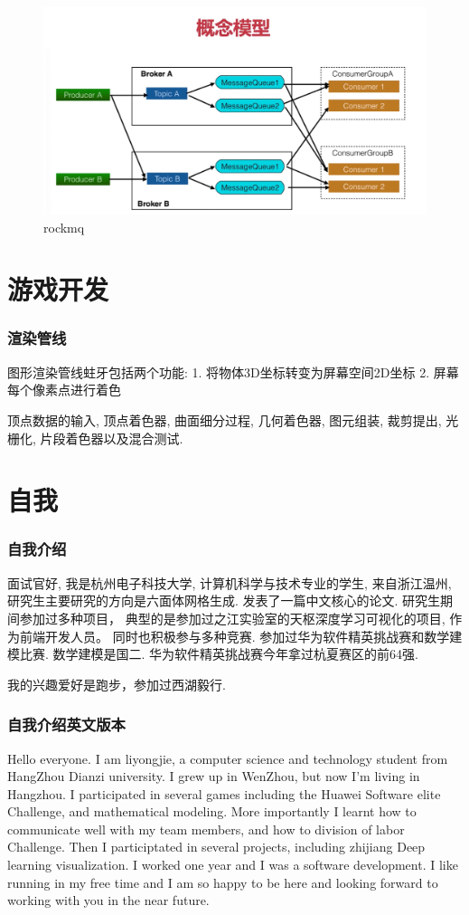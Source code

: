 \documentclass[UTF8]{ctexart}
\begin{document}
\begin{figure}
	\centering
	\includegraphics[width=0.7\linewidth]{figures/rockmq.png}
	\caption{rockmq}
	\label{fig:rockmq}
\end{figure}

\section{游戏开发}
\subsubsection{渲染管线}
图形渲染管线蛀牙包括两个功能:
1. 将物体3D坐标转变为屏幕空间2D坐标
2. 屏幕每个像素点进行着色

顶点数据的输入, 顶点着色器, 曲面细分过程, 几何着色器, 图元组装, 裁剪提出, 光栅化, 片段着色器以及混合测试.

\section{自我}
\subsubsection{自我介绍}
面试官好, 我是杭州电子科技大学, 计算机科学与技术专业的学生, 来自浙江温州,
研究生主要研究的方向是六面体网格生成. 发表了一篇中文核心的论文.
研究生期间参加过多种项目， 典型的是参加过之江实验室的天枢深度学习可视化的项目, 作为前端开发人员。
同时也积极参与多种竞赛. 参加过华为软件精英挑战赛和数学建模比赛. 数学建模是国二. 华为软件精英挑战赛今年拿过杭夏赛区的前64强. \par
我的兴趣爱好是跑步，参加过西湖毅行.
\subsubsection{自我介绍英文版本}
Hello everyone. I am liyongjie, a computer science and technology student from HangZhou Dianzi university. I grew up in WenZhou, but now I'm living in Hangzhou. I participated in several games including the Huawei Software elite Challenge, and mathematical modeling. More importantly I learnt how to communicate well with my team members, and how to division of labor Challenge. Then I participtated in several projects, including zhijiang Deep learning visualization. I worked one year and I was a software development. I like running in my free time and I am so happy to be here and looking forward to working with you in the near future.
\end{document}
